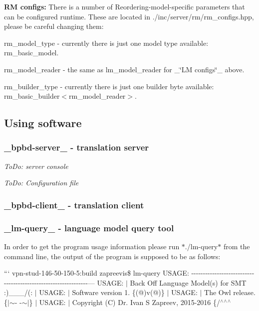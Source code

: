 {\bfseries R\+M configs\+:} There is a number of Reordering-\/model-\/specific parameters that can be configured runtime. These are located in {\ttfamily ./inc/server/rm/rm\+\_\+configs.hpp}, please be careful changing them\+:


\begin{DoxyItemize}
\item {\ttfamily rm\+\_\+model\+\_\+type} -\/ currently there is just one model type available\+: {\ttfamily rm\+\_\+basic\+\_\+model}.
\item {\ttfamily rm\+\_\+model\+\_\+reader} -\/ the same as {\ttfamily lm\+\_\+model\+\_\+reader} for \+\_\+\char`\"{}\+L\+M configs\char`\"{}\+\_\+ above.
\item {\ttfamily rm\+\_\+builder\+\_\+type} -\/ currently there is just one builder byte available\+: {\ttfamily rm\+\_\+basic\+\_\+builder$<$rm\+\_\+model\+\_\+reader$>$}.
\end{DoxyItemize}

\subsection*{Using software}

\subsubsection*{\+\_\+bpbd-\/server\+\_\+ -\/ translation server}

{\itshape To\+Do\+: server console}

{\itshape To\+Do\+: Configuration file} \subsubsection*{\+\_\+bpbd-\/client\+\_\+ -\/ translation client}

\subsubsection*{\+\_\+lm-\/query\+\_\+ -\/ language model query tool}

In order to get the program usage information please run $\ast$./lm-\/query$\ast$ from the command line, the output of the program is supposed to be as follows\+:

``` vpn-\/stud-\/146-\/50-\/150-\/5\+:build zapreevis\$ lm-\/query U\+S\+A\+G\+E\+: -\/-\/-\/-\/-\/-\/-\/-\/-\/-\/-\/-\/-\/-\/-\/-\/-\/-\/-\/-\/-\/-\/-\/-\/-\/-\/-\/-\/-\/-\/-\/-\/-\/-\/-\/-\/-\/-\/-\/-\/-\/-\/-\/-\/-\/-\/-\/-\/-\/-\/-\/-\/-\/-\/-\/-\/-\/-\/-\/-\/-\/-\/-\/--- U\+S\+A\+G\+E\+: $\vert$ Back Off Language Model(s) for S\+M\+T \+:)\+\_\+\+\_\+\+\_\+/(\+: $\vert$ U\+S\+A\+G\+E\+: $\vert$ Software version 1. \{(@)v(@)\} $\vert$ U\+S\+A\+G\+E\+: $\vert$ The Owl release. \{$\vert$$\sim$-\/ -\/$\sim$$\vert$\} $\vert$ U\+S\+A\+G\+E\+: $\vert$ Copyright (C) Dr. Ivan S Zapreev, 2015-\/2016 \{/$^\wedge$\textquotesingle{}$^\wedge$\textquotesingle{}$^\wedge$ 